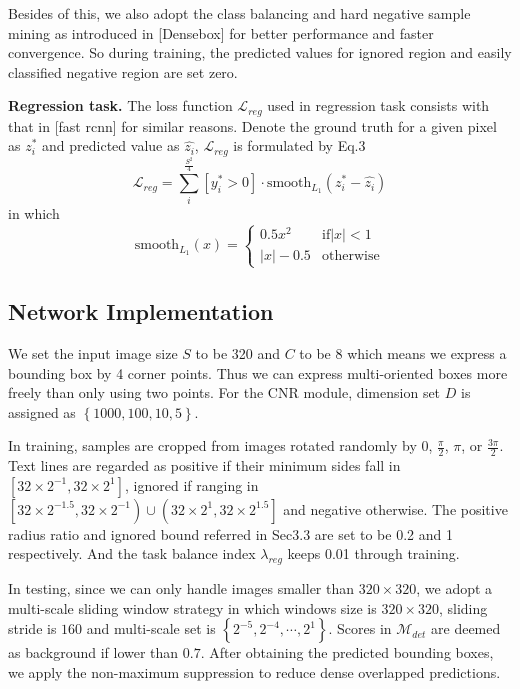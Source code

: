 \documentclass[10pt,twocolumn,letterpaper]{article}
\begin{document}
	Besides of this, we also adopt the class balancing and hard negative sample mining as introduced in [Densebox] for better performance and faster convergence. So during training, the predicted values for ignored region and easily classified negative region are set zero.
	
	\noindent \textbf{Regression task.}
	The loss function $\mathcal{L}_{reg}$ used in regression task consists with that in [fast rcnn] for similar reasons. Denote the ground truth for a given pixel as $z^{\ast}_{i}$ and predicted value as $\hat{z_{i}}$, $\mathcal{L}_{reg}$ is formulated by Eq.3
	\begin{equation}
		\mathcal{L}_{reg} = \sum_{i}^{\frac{S^2}{4}} \left[y^{\ast}_i > 0\right] \cdot \text{smooth}_{L_1} \left(z^{\ast}_{i} - \hat{z_{i}}\right)
	\end{equation}
	in which 
	\begin{equation}
		\text{smooth}_{L_1}\left(x\right) = 
			\left\{\begin{matrix}
			0.5x^2 & \text{if} \left | x \right |  < 1 \\ 
			\left |x\right | - 0.5 & \text{otherwise}
			\end{matrix}\right.
	\end{equation}
	
	\subsection{Network Implementation}
	We set the input image size $S$ to be 320 and $C$ to be 8 which means we express a bounding box by 4 corner points. Thus we can express multi-oriented boxes more freely than only using two points. 
	For the CNR module, dimension set $D$ is assigned as $\left\{1000, 100, 10, 5\right\}$. 

	In training, samples are cropped from images rotated randomly by $0$, $\frac{\pi}{2}$, $\pi$, or $\frac{3\pi}{2}$. Text lines are regarded as positive if their minimum sides fall in $\left[32 \times 2^{-1}, 32 \times 2^{1} \right]$, ignored if ranging in $\left[32 \times 2^{-1.5},  32 \times 2^{-1}\right) \cup \left(32 \times 2^{1},  32 \times 2^{1.5}\right]$ and negative otherwise. The positive radius ratio and ignored bound referred in Sec3.3 are set to be 0.2 and 1 respectively. And the task balance index $\lambda_{reg}$ keeps 0.01 through training.

	In testing, since we can only handle images smaller than $320 \times 320$, we adopt a multi-scale sliding window strategy in which windows size is $320 \times 320$, sliding stride is $160$ and multi-scale set is $\left\{2^{-5}, 2^{-4}, \cdots, 2^{1}\right\}$. Scores in $\mathcal{M}_{det}$ are deemed as background if lower than $0.7$. After obtaining the predicted bounding boxes, we apply the non-maximum suppression to reduce dense overlapped predictions.
\end{document}

